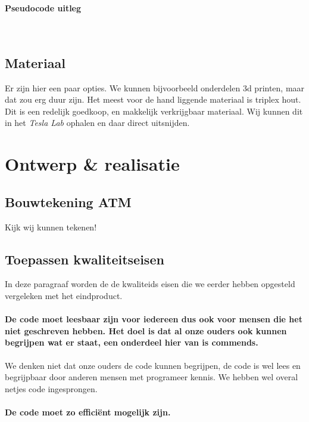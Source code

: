 \documentclass{article}
\begin{document}
\paragraph{Pseudocode uitleg}\ 



\newpage

\subsection{Materiaal}

Er zijn hier een paar opties.
We kunnen bijvoorbeeld onderdelen 3d printen, maar dat zou erg duur zijn.
Het meest voor de hand liggende materiaal is triplex hout.
Dit is een redelijk goedkoop, en makkelijk verkrijgbaar materiaal.
Wij kunnen dit in het \emph{Tesla Lab} ophalen en daar direct uitsnijden.

\section{Ontwerp \& realisatie}

\subsection{Bouwtekening ATM}

Kijk wij kunnen tekenen!

\subsection{Toepassen kwaliteitseisen}

In deze paragraaf worden de de kwaliteids eisen die we eerder hebben opgesteld vergeleken met het eindproduct.


\paragraph{De code moet leesbaar zijn voor iedereen dus ook voor mensen die het niet geschreven hebben. Het doel is dat al onze ouders ook kunnen begrijpen wat er staat, een onderdeel hier van is commends.}
We denken niet dat onze ouders de code kunnen begrijpen, de code is wel lees en begrijpbaar door anderen mensen met programeer kennis. We hebben wel overal netjes code ingesprongen.
\paragraph{De code moet zo efficiënt mogelijk zijn.}
\end{document}
